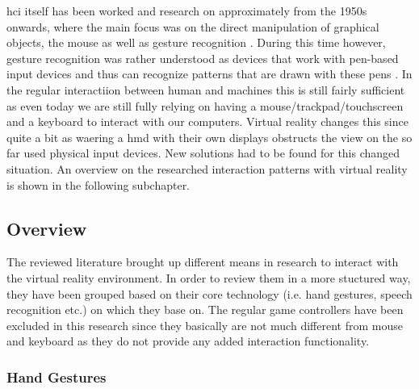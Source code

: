 \gls{hci} itself has been worked and research on approximately from the 1950s onwards, where the main focus was on the direct manipulation of graphical objects, the mouse as well as gesture recognition \citep{Myers1998}. During this time however, gesture recognition was rather understood as devices that work with pen-based input devices and thus can recognize patterns that are drawn with these pens \citep{Myers1998}. In the regular interactiion between human and machines this is still fairly sufficient as even today we are still fully relying on having a mouse/trackpad/touchscreen and a keyboard to interact with our computers. \newline
Virtual reality changes this since quite a bit as waering a \gls{hmd} with their own displays obstructs the view on the so far used physical input devices. New solutions had to be found for this changed situation. An overview on the researched interaction patterns with virtual reality is shown in the following subchapter.



\subsection{Overview}

The reviewed literature brought up different means in research to interact with the virtual reality environment. In order to review them in a more stuctured way, they have been grouped based on their core technology (i.e. hand gestures, speech recognition etc.) on which they base on. The regular game controllers have been excluded in this research since they basically are not much different from mouse and keyboard as they do not provide any added interaction functionality.


\subsubsection{Hand Gestures}

